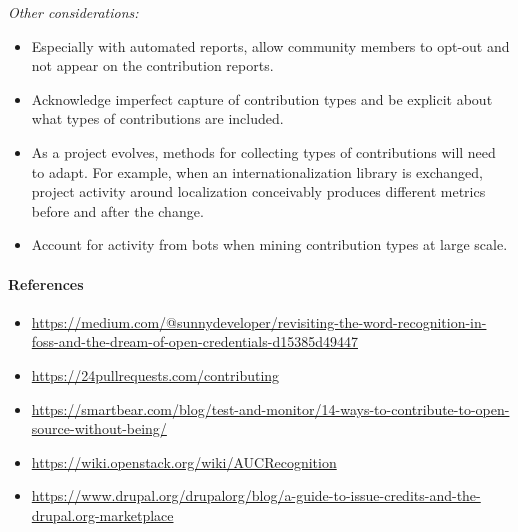 \emph{Other considerations:}

\begin{itemize}
\tightlist
\item
  Especially with automated reports, allow community members to opt-out
  and not appear on the contribution reports.
\item
  Acknowledge imperfect capture of contribution types and be explicit
  about what types of contributions are included.
\item
  As a project evolves, methods for collecting types of contributions
  will need to adapt. For example, when an internationalization library
  is exchanged, project activity around localization conceivably
  produces different metrics before and after the change.
\item
  Account for activity from bots when mining contribution types at large
  scale.
\end{itemize}

\hypertarget{references}{%
\paragraph{References}\label{references}}

\begin{itemize}
\tightlist
\item
  \url{https://medium.com/@sunnydeveloper/revisiting-the-word-recognition-in-foss-and-the-dream-of-open-credentials-d15385d49447}
\item
  \url{https://24pullrequests.com/contributing}
\item
  \url{https://smartbear.com/blog/test-and-monitor/14-ways-to-contribute-to-open-source-without-being/}
\item
  \url{https://wiki.openstack.org/wiki/AUCRecognition}
\item
  \url{https://www.drupal.org/drupalorg/blog/a-guide-to-issue-credits-and-the-drupal.org-marketplace}
\end{itemize}
